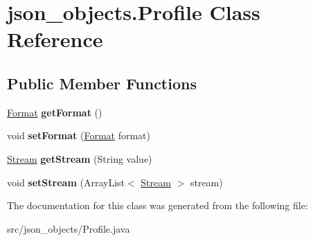 \hypertarget{classjson__objects_1_1_profile}{
\section{json\_\-objects.Profile Class Reference}
\label{classjson__objects_1_1_profile}
}
\subsection*{Public Member Functions}
\begin{DoxyCompactItemize}
\item 
\hypertarget{classjson__objects_1_1_profile_a7b87e038ecdaee5576fbbe7958916adf}{
\hyperlink{classjson__objects_1_1_format}{Format} {\bfseries getFormat} ()}
\label{classjson__objects_1_1_profile_a7b87e038ecdaee5576fbbe7958916adf}

\item 
\hypertarget{classjson__objects_1_1_profile_a6afa6f01a8fbc672f4596115ae0dcb0e}{
void {\bfseries setFormat} (\hyperlink{classjson__objects_1_1_format}{Format} format)}
\label{classjson__objects_1_1_profile_a6afa6f01a8fbc672f4596115ae0dcb0e}

\item 
\hypertarget{classjson__objects_1_1_profile_a7886efb9ecb4b98e41f38d22b0bda217}{
\hyperlink{classjson__objects_1_1_stream}{Stream} {\bfseries getStream} (String value)}
\label{classjson__objects_1_1_profile_a7886efb9ecb4b98e41f38d22b0bda217}

\item 
\hypertarget{classjson__objects_1_1_profile_aa3a12b4f8fd7cdc3fc6142e0fc9c4b14}{
void {\bfseries setStream} (ArrayList$<$ \hyperlink{classjson__objects_1_1_stream}{Stream} $>$ stream)}
\label{classjson__objects_1_1_profile_aa3a12b4f8fd7cdc3fc6142e0fc9c4b14}

\end{DoxyCompactItemize}


The documentation for this class was generated from the following file:\begin{DoxyCompactItemize}
\item 
src/json\_\-objects/Profile.java\end{DoxyCompactItemize}
